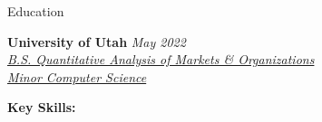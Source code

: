 \documentclass{resume/resume}
\begin{document}
\begin{rSection}{Education}

{\bf University of Utah} \hfill {\em May 2022}
\vspace{2pt}
\emph{
    \\ \href{https://eccles.utah.edu/programs/undergraduate/academics/majors/qamo/}{B.S. Quantitative Analysis of Markets \& Organizations}
    \\ \href{https://github.com/search?o=desc&q=user\%3ASpelkington&s=updated&type=Repositories}{Minor Computer Science}
}

%
%
%
%
%
%
%   
%
%
%
%

%
%
{\bf Key Skills:}
\vspace{-1.83em}


\end{rSection}
\end{document}
